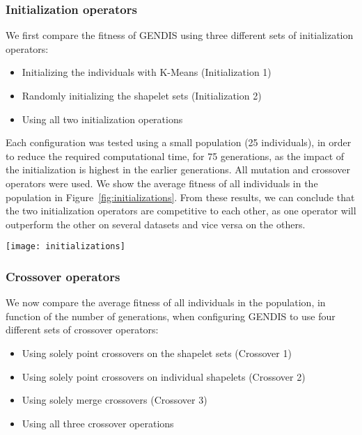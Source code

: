 \documentclass[runningheads]{llncs}
\begin{document}
\subsubsection{Initialization operators}
We first compare the fitness of GENDIS using three different sets of initialization operators:
\begin{itemize}
	\item Initializing the individuals with K-Means (Initialization 1)
	\item Randomly initializing the shapelet sets (Initialization 2)
	\item Using all two initialization operations
\end{itemize}
Each configuration was tested using a small population (25 individuals), in order to reduce the required computational time, for 75 generations, as the impact of the initialization is highest in the earlier generations. All mutation and crossover operators were used. We show the average fitness of all individuals in the population in Figure~\ref{fig:initializations}. From these results, we can conclude that the two initialization operators are competitive to each other, as one operator will outperform the other on several datasets and vice versa on the others.

\begin{figure*}
	\centering
	\texttt{[image: initializations]}
	\caption{The fitness in function of the number of generations, for six datasets, using three different configurations of initialization operations.}
	\label{fig:initializations}      
\end{figure*}

\subsubsection{Crossover operators}
We now compare the average fitness of all individuals in the population, in function of the number of generations, when configuring GENDIS to use four different sets of crossover operators:
\begin{itemize}
	\item Using solely point crossovers on the shapelet sets (Crossover 1)
	\item Using solely point crossovers on individual shapelets (Crossover 2)
	\item Using solely merge crossovers (Crossover 3)
	\item Using all three crossover operations
\end{itemize}
\end{document}
